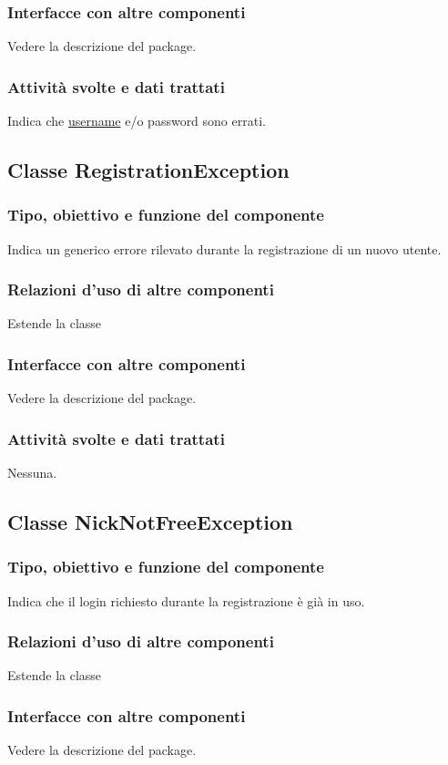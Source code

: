 \subsubsection*{Interfacce con altre componenti}
Vedere la descrizione del package.
\subsubsection*{Attivit\`a svolte e dati trattati}
Indica che \underline{username} e/o password sono errati.

\subsection{Classe RegistrationException}
\subsubsection*{Tipo, obiettivo e funzione del componente}
Indica un generico errore rilevato durante la registrazione di un nuovo utente.
\subsubsection*{Relazioni d'uso di altre componenti}
Estende la classe 
\subsubsection*{Interfacce con altre componenti}
Vedere la descrizione del package.
\subsubsection*{Attivit\`a svolte e dati trattati}
Nessuna.

\subsection{Classe NickNotFreeException}
\subsubsection*{Tipo, obiettivo e funzione del componente}
Indica che il login richiesto durante la registrazione \`e gi\`a in uso.
\subsubsection*{Relazioni d'uso di altre componenti}
Estende la classe 
\subsubsection*{Interfacce con altre componenti}
Vedere la descrizione del package.
